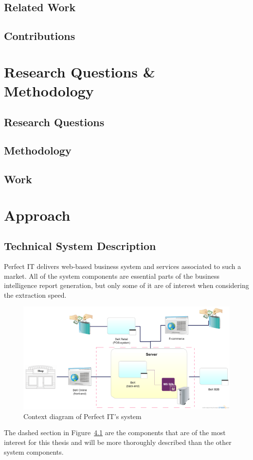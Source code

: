 \documentclass{cslthse-msc}
\begin{document}
\section{Related Work}
\section{Contributions}

\chapter{Research Questions \& Methodology}
\section{Research Questions}
\section{Methodology}
\section{Work}

\chapter{Approach}
\section{Technical System Description}
Perfect IT delivers web-based business system and services associated to such a market. All of the system components are essential parts of the business intelligence report generation, but only some of it are of interest when considering the extraction speed.
\begin{figure}[H]
\vspace{-15pt}
  \begin{center}
    \includegraphics[scale=0.3]{Systemdesc.png}
  \end{center}
  \caption{Context diagram of Perfect IT's system}
  \label{context}
  \vspace{-15pt}
\end{figure}
\noindent The dashed section in Figure~\ref{context} are the components that are of the most interest for this thesis and will be more thoroughly described than the other system components.
\end{document}
